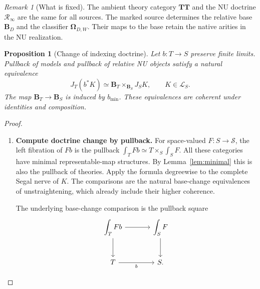 \documentclass[oneside]{article}
\theoremstyle{plain}
\newtheorem{proposition}[theorem]{Proposition}
\theoremstyle{definition}
\theoremstyle{remark}
\newtheorem{remark}[theorem]{Remark}
\newcommand{\B}{\mathbf B}
\newcommand{\J}{J}
\newcommand{\Om}{\boldsymbol\Omega}
\newcommand{\RNU}{\mathcal R_{\infty}}
\newcommand{\Sps}{\mathcal S}
\newcommand{\TT}{\mathbf{TT}}
\newcommand{\minrep}{\mathrm{min}}
\begin{document}
\begin{remark}[What is fixed]
The ambient theory category $\TT$ and the NU doctrine $\RNU$ are
the same for all sources. The marked source determines the relative
base $\B_D$ and the classifier $\Om_{D,W}$. Their maps to the base
retain the native arities in the NU realization.
\end{remark}

\begin{proposition}[Change of indexing doctrine]\label{prop:basechange}
Let $b:T\to S$ preserve finite limits. Pullback of models and pullback of relative NU objects satisfy a natural equivalence
\[
 \J_T(b^*K)\simeq
 \B_T\times_{\B_S}\J_SK,\qquad K\in\mathcal L_S.
\]
The map $\B_T\to\B_S$ is induced by $b_{\minrep}$. These equivalences are coherent under identities and composition.
\end{proposition}
\begin{proof}
\leavevmode
\begin{enumerate}
\item \textbf{Compute doctrine change by pullback.} For space-valued $F:S\to\Sps$, the left fibration of $Fb$ is the pullback $\int_T Fb\simeq T\times_S\int_SF.$ All these categories have minimal representable-map structures. By Lemma~\ref{lem:minimal} this is also the pullback of theories. Apply the formula degreewise to the complete Segal nerve of $K$. The comparisons are the natural base-change equivalences of unstraightening, which already include their higher coherence.
\begin{samepage}
The underlying base-change comparison is the pullback square
\[
\begin{tikzcd}[column sep=large,row sep=large]
 \displaystyle\int_T Fb\ar[r]\ar[d]&
 \displaystyle\int_SF\ar[d]\\
 T\ar[r,"b"']&S.
\end{tikzcd}
\qedhere
\]
\end{samepage}
\end{enumerate}
\end{proof}
\end{document}
